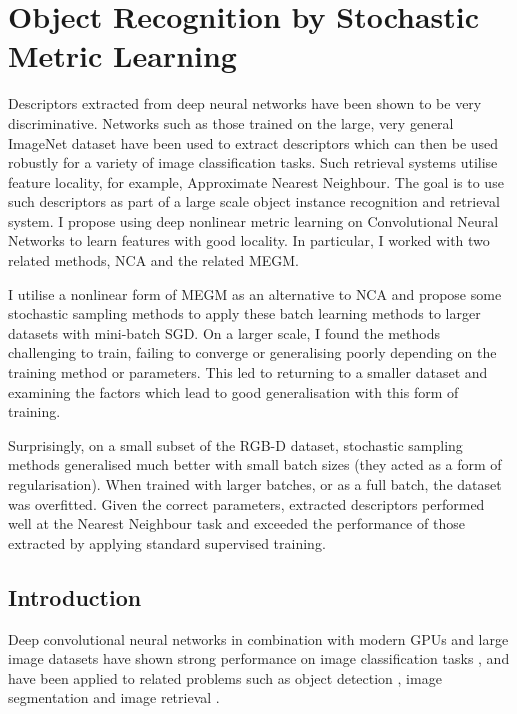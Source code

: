 
\chapter{Object Recognition by Stochastic Metric Learning}
\label{chap:metric} 

Descriptors extracted from deep neural networks have been shown to be very discriminative. Networks such as those trained on the large, very general ImageNet dataset have been used to extract descriptors which can then be used robustly for a variety of image classification tasks. Such retrieval systems utilise feature locality, for example, Approximate Nearest Neighbour. The goal is to use such descriptors as part of a large scale object instance recognition and retrieval system. I propose using deep nonlinear metric learning on Convolutional Neural Networks to learn features with good locality. In particular, I worked with two related methods, \gls{NCA} and the related \gls{MEGM}.

I utilise a nonlinear form of \gls{MEGM} as an alternative to \gls{NCA} and propose some stochastic sampling methods to apply these batch learning methods to larger datasets with mini-batch \gls{SGD}. On a larger scale, I found the methods challenging to train, failing to converge or generalising poorly depending on the training method or parameters. This led to returning to a smaller dataset and examining the factors which lead to good generalisation with this form of training.
  
Surprisingly, on a small subset of the RGB-D dataset, stochastic sampling methods generalised much better with small batch sizes (they acted as a form of regularisation). When trained with larger batches, or as a full batch, the dataset was overfitted. Given the correct parameters, extracted descriptors performed well at the Nearest Neighbour task and exceeded the performance of those extracted by applying standard supervised training.

\section{Introduction}

Deep convolutional neural networks in combination with modern \gls{GPU}s and large image datasets have shown strong performance on image classification tasks \cite {Krizhevsky2012}, and have been applied to related problems such as object detection \cite{Sermanet2013}, image segmentation \cite{Masci2013} and image retrieval \cite{Razavian2014}.

